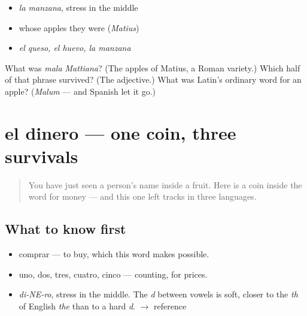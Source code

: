 \begin{itemize}
\raggedright
  \item \emph{la manzana}, stress in the middle
  \item whose apples they were (\emph{Matius})
  \item \emph{el queso, el huevo, la manzana}
\end{itemize}

\begin{tcolorbox}[breakable,colback=teal!4,colframe=teal!35!black,title={Before you move on}]
What was \emph{mala Mattiana}? (The apples of Matius, a Roman variety.) Which half of that phrase survived? (The adjective.) What was Latin's ordinary word for an apple? (\emph{Malum} — and Spanish let it go.)
\end{tcolorbox}
\section[el dinero]{el dinero — one coin, three survivals}

\label{lesson:ES-C280-dinero}



\begin{quote}
You have just seen a person's name inside a fruit. Here is a coin inside the word for money — and this one left tracks in three languages.
\end{quote}

\subsection*{What to know first}
\begin{itemize}
\raggedright
  \item comprar — to buy, which this word makes possible.
  \item uno, dos, tres, cuatro, cinco — counting, for prices.
\end{itemize}

\begin{sounds}
\begin{itemize}
\raggedright
  \item \emph{di-NE-ro}, stress in the middle. The \emph{d} between vowels is soft, closer to the \emph{th} of English \emph{the} than to a hard \emph{d}. $\to$ reference
\end{itemize}
\end{sounds}

